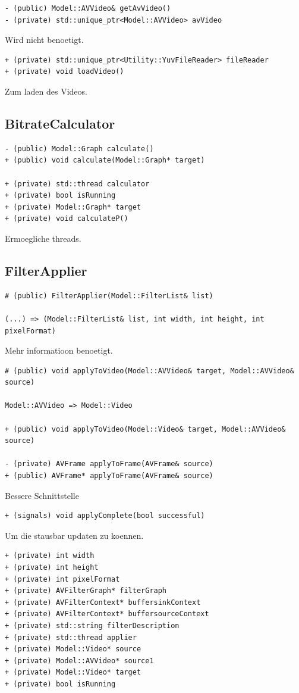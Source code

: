 \documentclass{scrartcl}
\begin{document}
{\begin{verbatim}
- (public) Model::AVVideo& getAvVideo()
- (private) std::unique_ptr<Model::AVVideo> avVideo
\end{verbatim}
Wird nicht benoetigt.

\begin{verbatim}
+ (private) std::unique_ptr<Utility::YuvFileReader> fileReader
+ (private) void loadVideo()
\end{verbatim}
Zum laden des Videos.
\subsection{BitrateCalculator}
\begin{verbatim}
- (public) Model::Graph calculate()
+ (public) void calculate(Model::Graph* target)

+ (private) std::thread calculator
+ (private) bool isRunning
+ (private) Model::Graph* target
+ (private) void calculateP()
\end{verbatim}
Ermoegliche threads.
\subsection{FilterApplier}
\begin{verbatim}
# (public) FilterApplier(Model::FilterList& list)

(...) => (Model::FilterList& list, int width, int height, int pixelFormat)
\end{verbatim}
Mehr informatioon benoetigt.
\begin{verbatim}
# (public) void applyToVideo(Model::AVVideo& target, Model::AVVideo& source)

Model::AVVideo => Model::Video

+ (public) void applyToVideo(Model::Video& target, Model::AVVideo& source)

- (private) AVFrame applyToFrame(AVFrame& source)
+ (public) AVFrame* applyToFrame(AVFrame& source)
\end{verbatim}
Bessere Schnittstelle
\begin{verbatim}
+ (signals) void applyComplete(bool successful)
\end{verbatim}
Um die stausbar updaten zu koennen.
\begin{verbatim}
+ (private) int width
+ (private) int height
+ (private) int pixelFormat
+ (private) AVFilterGraph* filterGraph
+ (private) AVFilterContext* buffersinkContext
+ (private) AVFilterContext* buffersourceContext
+ (private) std::string filterDescription
+ (private) std::thread applier
+ (private) Model::Video* source
+ (private) Model::AVVideo* source1
+ (private) Model::Video* target
+ (private) bool isRunning


\end{verbatim}}
\end{document}
